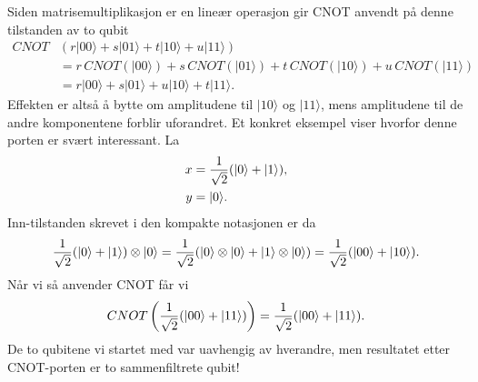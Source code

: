 Siden matrisemultiplikasjon er en lineær operasjon gir CNOT anvendt på denne tilstanden av to qubit
\begin{align*}
	CNOT&(r|00\rangle + s|01\rangle + t|10\rangle + u|11\rangle) \\
	&= r\,CNOT(|00\rangle) + s\,CNOT(|01\rangle) + t\,CNOT(|10\rangle) + u\,CNOT(|11\rangle) \\
	&=r|00\rangle + s|01\rangle + u|10\rangle + t|11\rangle.
\end{align*}
Effekten er altså å bytte om amplitudene til $|10\rangle$ og $|11\rangle$, mens amplitudene til de andre komponentene forblir uforandret. Et konkret eksempel viser hvorfor denne porten er svært interessant. La 
\begin{align*}
	x &= \frac{1}{\sqrt{2}}(|0\rangle + |1\rangle), \\
	y &= |0\rangle.
\end{align*}
Inn-tilstanden skrevet i den kompakte notasjonen er da
\begin{displaymath}
	\frac{1}{\sqrt{2}}(|0\rangle + |1\rangle)\otimes|0\rangle = \frac{1}{\sqrt{2}}( |0\rangle\otimes|0\rangle + |1\rangle\otimes|0\rangle) = \frac{1}{\sqrt{2}}(|00\rangle + |10\rangle).
\end{displaymath}
Når vi så anvender CNOT får vi
\begin{displaymath}
	CNOT\left( \frac{1}{\sqrt{2}}(|00\rangle + |11\rangle) \right) = \frac{1}{\sqrt{2}}(|00\rangle + |11\rangle).
\end{displaymath}
De to qubitene vi startet med var uavhengig av hverandre, men resultatet etter CNOT-porten er to sammenfiltrete qubit!